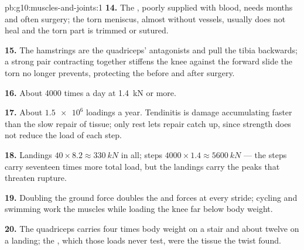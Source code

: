 \begin{solution}{pb:g10:muscles-and-joints:1}
\textbf{14.} The , poorly supplied with blood, needs months
and often surgery; the torn meniscus,  almost without
vessels, usually does not heal and the torn part is trimmed or
sutured.

\textbf{15.} The hamstrings are the quadriceps' antagonists and pull
the tibia backwards; a strong pair contracting together stiffens the
knee against the forward slide the torn  no longer prevents,
protecting the  before and after surgery.

\textbf{16.} About 4000 times a day at \qty{1.4}{kN} or more.

\textbf{17.} About $\num{1.5e6}$ loadings a year. Tendinitis is damage
accumulating faster than the slow repair of  tissue; only rest
lets repair catch up, since strength does not reduce the load of each
step.

\textbf{18.} Landings $40 \times 8.2 \approx \qty{330}{kN}$ in all;
steps $4000 \times 1.4 \approx \qty{5600}{kN}$ --- the steps carry
seventeen times more total load, but the landings carry the peaks that
threaten rupture.

\textbf{19.} Doubling the ground force doubles the  and 
forces at every stride; cycling and swimming work the muscles while
loading the knee far below body weight.

\textbf{20.} The quadriceps  carries four times body weight on a
stair and about twelve on a landing; the , which those loads
never test, were the tissue the twist found.
\end{solution}
